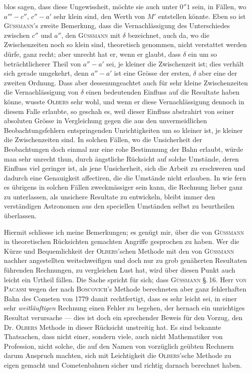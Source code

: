 \noindent blos sagen, dass diese Ungewissheit, möchte sie auch unter $0''1$ sein, in Fällen, wo $a'''\!-c''$, $c''\!-a'$ sehr klein sind, den Werth von $M'$ entstellen könnte. Eben so ist \textsc{Güssmann}'s zweite Bemerkung, dass die Vernachlässigung des Unterschiedes zwischen $c''$ und $a''$, den \textsc{Güssmann} mit $\delta$ bezeichnet, auch da, wo die Zwischenzeiten noch so klein sind, theoretisch genommen, nicht verstattet werden dürfe, ganz recht; aber unrecht hat er, wenn er glaubt, dass $\delta$ ein um so beträchtlicherer Theil von $a''\!-a'$ sei, je kleiner die Zwischenzeit ist; dies verhält sich gerade umgekehrt, denn $a''\!-a'$ ist eine Grösse der ersten, $\delta$ aber eine der zweiten Ordnung. Dass aber dessenungeachtet auch für sehr kleine Zwischenzeiten die Vernachlässigung von $\delta$ einen bedeutenden Einfluss auf die Resultate haben könne, wusste \textsc{Olbers} sehr wohl, und wenn er diese Vernachlässigung dennoch in diesem Falle erlaubte, so geschah es, weil dieser Einfluss abstrahirt von seiner absoluten Grösse in Vergleichung gegen die aus den unvermeidlichen Beobachtungsfehlern entspringenden Unrichtigkeiten um so kleiner ist, je kleiner die Zwischenzeiten sind. In solchen Fällen, wo die Unsicherheit der Beobachtungen doch einmal nur eine rohe Bestimmung der Bahn erlaubt, würde man sehr unrecht thun, durch ängstliche Rücksicht auf solche Umstände, deren Einfluss viel geringer ist, als jene Unsicherheit, sich die Arbeit zu erschweren und dadurch eine Genauigkeit affectiren, die die Umstände nicht erlauben. In wie fern es übrigens in solchen Fällen zweckmässiger sein kann, die Rechnung lieber ganz zu unterlassen, als unsichere Resultate zu entwickeln, bleibt immer den verständigen Astronomen aus den speciellen Umständen selbst zu beurtheilen überlassen.

Hiermit schliesse ich meine Bemerkungen; es genügt mir, über die von \textsc{Güssmann} in theoretischen Rücksichten gemachten Angriffe gesprochen zu haben. Wer die Kürze und Bequemlichkeit der \textsc{Olbers}'schen Methode mit den von \textsc{Güssmann} nachher angestellten weitschweifigen und doch nur zu grob genäherten Resultaten führenden Rechnungen, zu vergleichen Lust hat, wird über diesen Punkt auch leicht ein Urtheil fällen. Die Sache spricht für sich; dass \textsc{Güssmann} \S.\,16. Herr \textsc{von Pacassi} wegen der nach \textsc{Boscovich}'s Methode berechneten aber ganz fehlerhaften Bahn des Cometen von 1779 damit rechtfertigt, dass es sehr leicht sei, in einer sehr \emph{weitläuftigen} Rechnung einen Fehler zu begehen, der hernach ein unrichtiges Resultat verursache --- dies ist doch ein sprechender Beweis für den Vorzug, den Dr. \textsc{Olbers} Methode in dieser Rücksicht unstreitig hat. Es sind bekannte Thatsachen, dass nicht einer, sondern viele, auch nicht Mathematiker von Profession, nicht solche, die auf den Namen von vorzüglich geübten Rechnern darum Anspruch machten, sich mit Leichtigkeit die \textsc{Olbers}'sche Methode zu eigen gemacht und Cometenbahnen sicher und richtig darnach berechnet haben.
